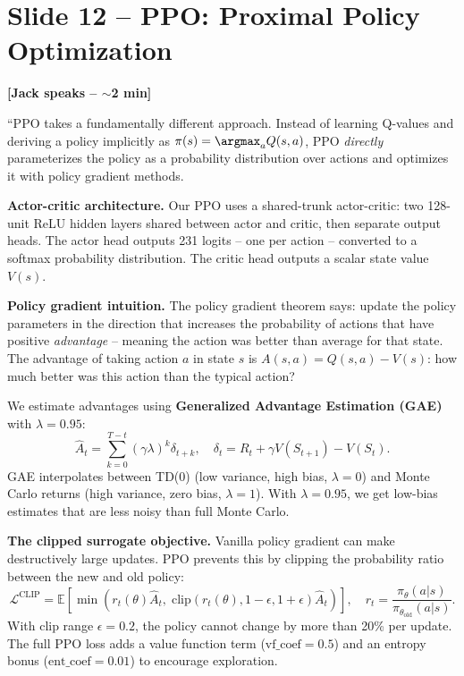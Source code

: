 \documentclass[11pt, letterpaper]{article}
\begin{document}
\section{Slide 12 -- PPO: Proximal Policy Optimization}

\textbf{[Jack speaks -- $\sim$2 min]}

``PPO takes a fundamentally different approach. Instead of learning Q-values and deriving a policy implicitly as $\pi(s) = \argmax_a Q(s,a)$, PPO \emph{directly} parameterizes the policy as a probability distribution over actions and optimizes it with policy gradient methods.

\textbf{Actor-critic architecture.} Our PPO uses a shared-trunk actor-critic: two 128-unit ReLU hidden layers shared between actor and critic, then separate output heads. The actor head outputs 231 logits -- one per action -- converted to a softmax probability distribution. The critic head outputs a scalar state value $V(s)$.

\textbf{Policy gradient intuition.} The policy gradient theorem says: update the policy parameters in the direction that increases the probability of actions that have positive \emph{advantage} -- meaning the action was better than average for that state. The advantage of taking action $a$ in state $s$ is $A(s,a) = Q(s,a) - V(s)$: how much better was this action than the typical action?

We estimate advantages using \textbf{Generalized Advantage Estimation (GAE)} with $\lambda = 0.95$:
\[
\hat{A}_t = \sum_{k=0}^{T-t} (\gamma \lambda)^k \delta_{t+k}, \quad \delta_t = R_t + \gamma V(S_{t+1}) - V(S_t).
\]
GAE interpolates between TD(0) (low variance, high bias, $\lambda=0$) and Monte Carlo returns (high variance, zero bias, $\lambda=1$). With $\lambda=0.95$, we get low-bias estimates that are less noisy than full Monte Carlo.

\textbf{The clipped surrogate objective.} Vanilla policy gradient can make destructively large updates. PPO prevents this by clipping the probability ratio between the new and old policy:
\[
\mathcal{L}^{\text{CLIP}} = \mathbb{E}\!\left[\min\!\left(r_t(\theta)\hat{A}_t,\; \text{clip}(r_t(\theta), 1\!-\!\epsilon, 1\!+\!\epsilon)\hat{A}_t\right)\right], \quad r_t = \frac{\pi_\theta(a|s)}{\pi_{\theta_{\text{old}}}(a|s)}.
\]
With clip range $\epsilon = 0.2$, the policy cannot change by more than 20\% per update. The full PPO loss adds a value function term ($\text{vf\_coef}=0.5$) and an entropy bonus ($\text{ent\_coef}=0.01$) to encourage exploration.
\end{document}
